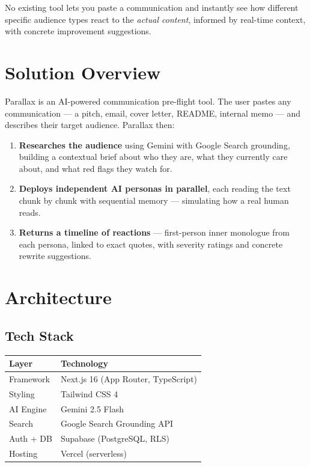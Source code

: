 \documentclass[a4paper, 11pt, twocolumn]{article}
\begin{document}
No existing tool lets you paste a communication and instantly see how different specific audience types react to the \textit{actual content}, informed by real-time context, with concrete improvement suggestions.

\section{Solution Overview}

Parallax is an AI-powered communication pre-flight tool. The user pastes any communication --- a pitch, email, cover letter, README, internal memo --- and describes their target audience. Parallax then:

\begin{enumerate}[nosep, leftmargin=1.2em]
    \item \textbf{Researches the audience} using Gemini with Google Search grounding, building a contextual brief about who they are, what they currently care about, and what red flags they watch for.
    \item \textbf{Deploys independent AI personas in parallel}, each reading the text chunk by chunk with sequential memory --- simulating how a real human reads.
    \item \textbf{Returns a timeline of reactions} --- first-person inner monologue from each persona, linked to exact quotes, with severity ratings and concrete rewrite suggestions.
\end{enumerate}

\section{Architecture}

\subsection{Tech Stack}

\begin{table}[H]
\centering
\begin{tabular}{ll}
\toprule
\textbf{Layer} & \textbf{Technology} \\
\midrule
Framework & Next.js 16 (App Router, TypeScript) \\
Styling & Tailwind CSS 4 \\
AI Engine & Gemini 2.5 Flash \\
Search & Google Search Grounding API \\
Auth + DB & Supabase (PostgreSQL, RLS) \\
Hosting & Vercel (serverless) \\
\bottomrule
\end{tabular}
\end{table}
\end{document}
